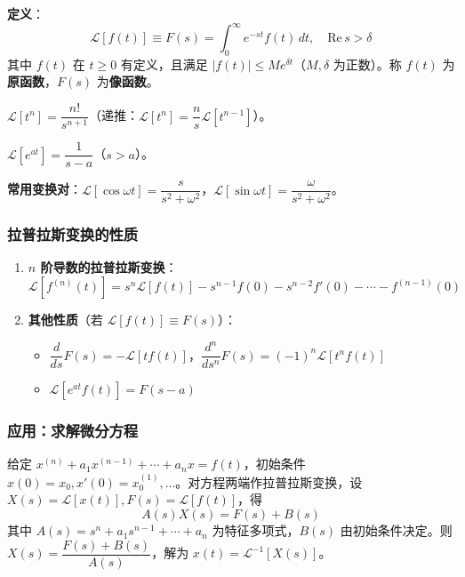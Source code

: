 \textbf{定义}：
$$\mathcal{L}[f(t)] \equiv F(s) = \int_0^{\infty} e^{-st}f(t)\,dt, \quad \mathrm{Re}\,s > \delta$$
其中 $f(t)$ 在 $t \ge 0$ 有定义，且满足 $|f(t)| \le Me^{\delta t}$（$M, \delta$ 为正数）。称 $f(t)$ 为\textbf{原函数}，$F(s)$ 为\textbf{像函数}。

\begin{example}
$\mathcal{L}[t^n] = \dfrac{n!}{s^{n+1}}$（递推：$\mathcal{L}[t^n] = \dfrac{n}{s}\mathcal{L}[t^{n-1}]$）。
\end{example}

\begin{example}
$\mathcal{L}[e^{at}] = \dfrac{1}{s-a}$（$s > a$）。
\end{example}

\textbf{常用变换对}：$\mathcal{L}[\cos\omega t] = \dfrac{s}{s^2+\omega^2}$，$\mathcal{L}[\sin\omega t] = \dfrac{\omega}{s^2+\omega^2}$。

\subsubsection{拉普拉斯变换的性质}

\begin{enumerate}
    \item \textbf{$n$ 阶导数的拉普拉斯变换}：
    $$\mathcal{L}[f^{(n)}(t)] = s^n\mathcal{L}[f(t)] - s^{n-1}f(0) - s^{n-2}f'(0) - \cdots - f^{(n-1)}(0)$$
    \item \textbf{其他性质}（若 $\mathcal{L}[f(t)] \equiv F(s)$）：
    \begin{itemize}
        \item $\dfrac{d}{ds}F(s) = -\mathcal{L}[tf(t)]$，$\dfrac{d^n}{ds^n}F(s) = (-1)^n\mathcal{L}[t^nf(t)]$
        \item $\mathcal{L}[e^{at}f(t)] = F(s-a)$
    \end{itemize}
\end{enumerate}

\subsubsection{应用：求解微分方程}

给定 $x^{(n)} + a_1x^{(n-1)} + \cdots + a_nx = f(t)$，初始条件 $x(0) = x_0, x'(0) = x_0^{(1)}, \ldots$。对方程两端作拉普拉斯变换，设 $X(s) = \mathcal{L}[x(t)], F(s) = \mathcal{L}[f(t)]$，得
$$A(s)X(s) = F(s) + B(s)$$
其中 $A(s) = s^n + a_1s^{n-1} + \cdots + a_n$ 为特征多项式，$B(s)$ 由初始条件决定。则 $X(s) = \dfrac{F(s) + B(s)}{A(s)}$，解为 $x(t) = \mathcal{L}^{-1}[X(s)]$。

